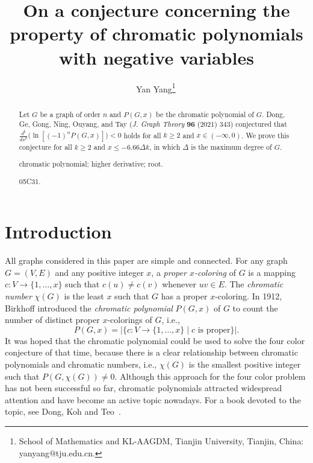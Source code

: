 \documentclass[12pt]{article}
\theoremstyle{definition}
\begin{document}
\title{On a conjecture concerning the property of chromatic polynomials with negative variables}

\author{Yan Yang\thanks{School of Mathematics and KL-AAGDM, Tianjin University, Tianjin, China: yanyang@tju.edu.cn.}\,
}

\date{}

\maketitle

\begin{abstract}
  Let \( G \) be a graph of order \( n \) and $P(G,x)$ be the chromatic polynomial of $G$.
Dong, Ge, Gong, Ning, Ouyang, and Tay (\emph{J. Graph Theory} {\bf96} (2021) 343) conjectured that
\(
\frac{d^k}{dx^k} \bigl( \ln[(-1)^n P(G, x)] \bigr) < 0
\)
holds for all \( k \geq 2 \) and \( x \in (-\infty, 0) \). We prove this conjecture for all \( k \geq 2 \) and \( x\leq -6.66\Delta k \), in which $\Delta$ is
the maximum degree of $G$.

\medskip
{} chromatic polynomial; higher derivative; root.

\smallskip
{} 05C31.
\end{abstract}


\section{Introduction}
All graphs considered in this paper are simple and connected. For any graph $G=(V, E)$ and any positive integer $x$,  a {\it proper $x$-coloring} of $G$ is a mapping $c: V\rightarrow \{1,\ldots,x\}$ such that
$c(u)\neq c(v)$ whenever $uv\in E$. The {\it chromatic number} $\chi(G)$ is the least $x$ such that $G$ has a proper $x$-coloring.
In 1912, Birkhoff \cite{B1912}
introduced the {\it chromatic polynomial} $P(G,x)$ of $G$  to count the number of distinct proper $x$-colorings of $G$, i.e.,
$$P(G,x)=|\{c: V\rightarrow \{1,\ldots,x\} \mid c\text{ is proper}\}|.$$
It was hoped that the chromatic polynomial could be used to solve the four color conjecture of that time, because there is a clear relationship between chromatic polynomials and chromatic numbers, i.e., $\chi(G)$ is the smallest positive integer such that $P(G, \chi(G))\neq 0$.
Although this approach for the four color problem has not been successful so far, chromatic polynomials attracted widespread attention and have become an active topic nowadays. For a book devoted to the topic, see Dong, Koh and Teo~\cite{DKT05}.
\end{document}
